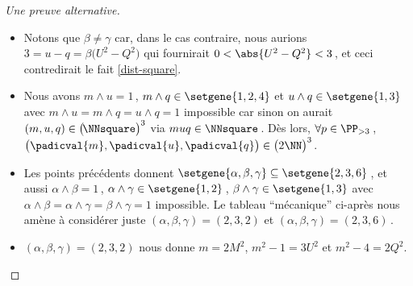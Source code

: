 \begin{proof}[Une preuve alternative]
\begin{itemize}
		\item Notons que $\beta \neq \gamma$ car, dans le cas contraire, nous aurions $3 = u - q = \beta \big( U^2 - Q^2 \big)$ qui fournirait $0 < \abs{U^2 - Q^2} < 3$\,, et ceci contredirait le fait \ref{dist-square}.


		\item Nous avons $m \wedge u = 1$\,, $m \wedge q \in \setgene{1, 2, 4}$ et $u \wedge q \in \setgene{1, 3}$
		avec $m \wedge u = m \wedge q = u \wedge q = 1$ impossible car sinon on aurait $(m, u, q) \in \big( \kern-1.5pt\NNsquare \big)^3$ via $muq \in \NNsquare$\,.
		Dès lors, $\forall p \in \PP_{>3}$\,, $\big( \padicval{m} , \padicval{u} , \padicval{q} \big) \in \big( 2 \NN \big)^3$.


		\item Les points précédents donnent 
		$\setgene{\alpha, \beta, \gamma} \subseteq \setgene{2, 3, 6}$\,,
		et aussi 
		$\alpha \wedge \beta = 1$\,, $\alpha \wedge \gamma \in \setgene{1, 2}$\,, $\beta \wedge \gamma \in \setgene{1, 3}$
		avec $\alpha \wedge \beta = \alpha \wedge \gamma = \beta \wedge \gamma = 1$ impossible. 
		Le tableau \enquote{mécanique} ci-après nous amène à considérer juste $(\alpha, \beta, \gamma) = (2, 3, 2)$ et  $(\alpha, \beta, \gamma) = (2, 3, 6)$\,.
	\end{itemize}

	\begin{center}
	\end{center}


	\begin{itemize}
		\item $(\alpha, \beta, \gamma) = (2, 3, 2)$ nous donne $m = 2 M^2$, $m^2 - 1 = 3 U^2$ et $m^2 - 4 = 2 Q^2$.



\end{itemize}
\end{proof}
